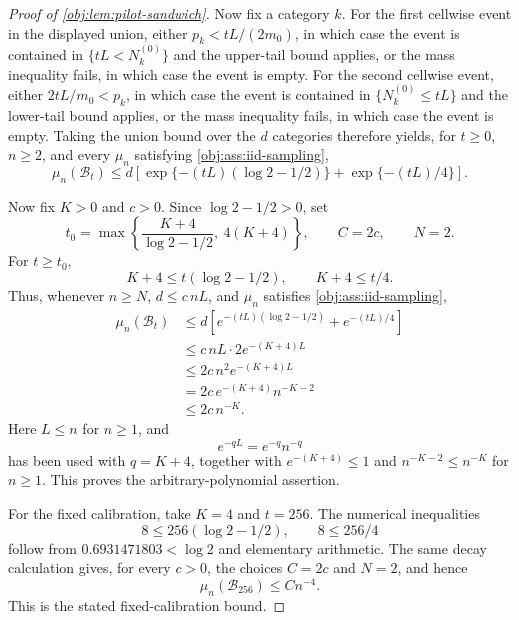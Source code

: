 \begin{proof}[Proof of \cref{obj:lem:pilot-sandwich}]
Now fix a category \(k\). For the first cellwise event in the displayed union, either
\(p_k<tL/(2m_0)\), in which case the event is contained in \(\{tL<N_k^{(0)}\}\) and the upper-tail bound applies, or the mass inequality fails, in which case the event is empty. For the second cellwise event, either \(2tL/m_0<p_k\), in which case the event is contained in \(\{N_k^{(0)}\le tL\}\) and the lower-tail bound applies, or the mass inequality fails, in which case the event is empty. Taking the union bound over the \(d\) categories therefore yields, for \(t\ge0\), \(n\ge2\), and every \(\mu_n\) satisfying \cref{obj:ass:iid-sampling},
\[
\mu_n(\mathcal B_t)
\le
d\left[
\exp\{-(tL)(\log 2-1/2)\}
+
\exp\{-(tL)/4\}
\right].
\]

Now fix \(K>0\) and \(c>0\). Since \(\log 2-1/2>0\), set
\[
t_0
=
\max\left\{
\frac{K+4}{\log 2-1/2},\ 4(K+4)
\right\},
\qquad
C=2c,
\qquad
N=2 .
\]
For \(t\ge t_0\),
\[
K+4\le t(\log 2-1/2),
\qquad
K+4\le t/4 .
\]
Thus, whenever \(n\ge N\), \(d\le c\,nL\), and \(\mu_n\) satisfies \cref{obj:ass:iid-sampling},
\[
\begin{aligned}
\mu_n(\mathcal B_t)
&\le d\left[
e^{-(tL)(\log 2-1/2)}+e^{-(tL)/4}
\right] \\
&\le
c\,nL\cdot 2e^{-(K+4)L} \\
&\le 2c\,n^2 e^{-(K+4)L} \\
&=2c\,e^{-(K+4)}n^{-K-2} \\
&\le 2c\,n^{-K}.
\end{aligned}
\]
Here \(L\le n\) for \(n\ge1\), and
\[
e^{-qL}=e^{-q}n^{-q}
\]
has been used with \(q=K+4\), together with \(e^{-(K+4)}\le1\) and
\(n^{-K-2}\le n^{-K}\) for \(n\ge1\). This proves the arbitrary-polynomial assertion.

For the fixed calibration, take \(K=4\) and \(t=256\). The numerical inequalities
\[
8\le256(\log 2-1/2),
\qquad
8\le256/4
\]
follow from \(0.6931471803<\log 2\) and elementary arithmetic. The same decay calculation gives, for every \(c>0\), the choices \(C=2c\) and \(N=2\), and hence
\[
\mu_n(\mathcal B_{256})\le Cn^{-4}.
\]
This is the stated fixed-calibration bound.
\end{proof}
